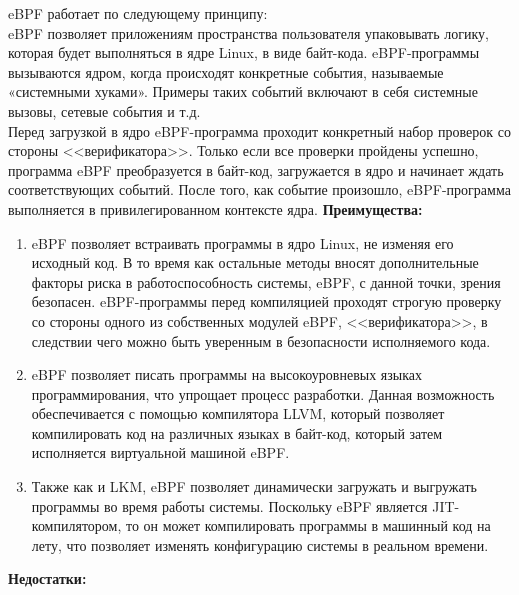 
eBPF работает по следующему принципу:\\%

eBPF позволяет приложениям пространства пользователя упаковывать логику, которая будет выполняться в ядре Linux, в виде байт-кода.
eBPF-программы вызываются ядром, когда происходят конкретные события, называемые «системными хуками».
Примеры таких событий включают в себя системные вызовы, сетевые события и т.д.\\
Перед загрузкой в ядро eBPF-программа проходит конкретный набор проверок со стороны <<верификатора>>.
Только если все проверки пройдены успешно, программа eBPF преобразуется в байт-код, загружается в ядро и начинает ждать соответствующих событий.
После того, как событие произошло, eBPF-программа выполняется в привилегированном контексте ядра.
\textbf{Преимущества:}

\begin{enumerate}
    \item eBPF позволяет встраивать программы в ядро Linux, не изменяя его исходный код.
    В то время как остальные методы вносят дополнительные факторы риска в работоспособность системы, eBPF, с данной точки, зрения безопасен.
    eBPF-программы перед компиляцией проходят строгую проверку со стороны одного из собственных модулей eBPF, <<верификатора>>, в следствии чего можно быть уверенным в безопасности исполняемого кода.
    \item eBPF позволяет писать программы на высокоуровневых языках программирования, что упрощает процесс разработки.
    Данная возможность обеспечивается с помощью компилятора LLVM, который позволяет компилировать код на различных языках в байт-код, который затем исполняется виртуальной машиной eBPF.
    \item Также как и LKM, eBPF позволяет динамически загружать и выгружать программы во время работы системы. %
    Поскольку eBPF является JIT-компилятором, то он может компилировать программы в машинный код на лету, что позволяет изменять конфигурацию системы в реальном времени.
\end{enumerate}

\textbf{Недостатки:}

